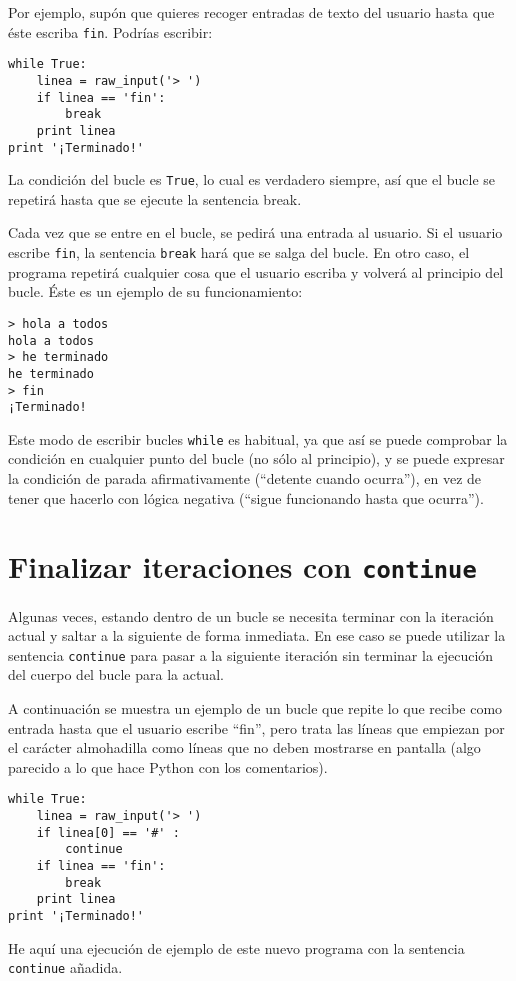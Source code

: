 Por ejemplo, supón que quieres recoger entradas de texto del usuario hasta que
éste escriba {\tt fin}. Podrías escribir:

\beforeverb
\begin{verbatim}
while True:
    linea = raw_input('> ')
    if linea == 'fin':
        break
    print linea
print '¡Terminado!'
\end{verbatim}
\afterverb
%
La condición del bucle es {\tt True}, lo cual es verdadero siempre, así que
el bucle se repetirá hasta que se ejecute la sentencia break.

Cada vez que se entre en el bucle, se pedirá una entrada al usuario.
Si el usuario escribe {\tt fin}, la sentencia {\tt break} hará que se
salga del bucle. En otro caso, el programa repetirá cualquier cosa que el usuario
escriba y volverá al principio del bucle. Éste es un ejemplo de su funcionamiento:

\beforeverb
\begin{verbatim}
> hola a todos
hola a todos
> he terminado
he terminado
> fin
¡Terminado!
\end{verbatim}
\afterverb
%
Este modo de escribir bucles {\tt while} es habitual, ya que
así se puede comprobar la condición en cualquier punto del
bucle (no sólo al principio), y se puede expresar la condición de parada
afirmativamente (``detente cuando ocurra''), en vez de tener que hacerlo con lógica negativa
(``sigue funcionando hasta que ocurra'').

\section{Finalizar iteraciones con {\tt continue}}

Algunas veces, estando dentro de un bucle se necesita
terminar con la iteración actual y saltar a la siguiente de forma inmediata.
En ese caso se puede utilizar la sentencia
{\tt continue} para pasar a la siguiente iteración sin terminar
la ejecución del cuerpo del bucle para la actual.

A continuación se muestra un ejemplo de un bucle que repite lo que recibe como entrada hasta que
el usuario escribe ``fin'', pero trata las líneas que empiezan por el carácter almohadilla
como líneas que no deben mostrarse en pantalla (algo parecido a lo que hace Python con los comentarios).

\beforeverb
\begin{verbatim}
while True:
    linea = raw_input('> ')
    if linea[0] == '#' :
        continue
    if linea == 'fin':
        break
    print linea
print '¡Terminado!'
\end{verbatim}
\afterverb
%
He aquí una ejecución de ejemplo de este nuevo programa con la sentencia {\tt continue} añadida.

